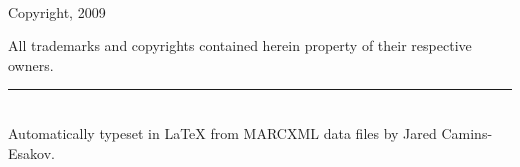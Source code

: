 {\small
~\\[4cm]

\begin{center}
Copyright, 2009\\[2cm]
\end{center}

\begin{flushleft}
All trademarks and copyrights contained herein property of their respective owners.

\vfill

\rule{6cm}{0.25mm}\\[0.2cm]
Automatically typeset in {\LaTeX} from MARCXML data files by Jared Camins-Esakov.
\end{flushleft}
}

